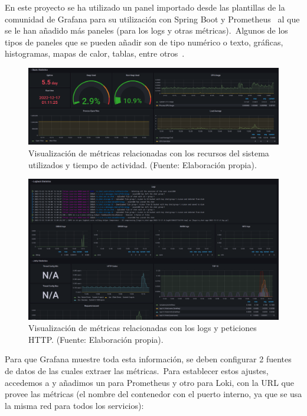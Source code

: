 En este proyecto se ha utilizado un panel importado desde las plantillas de la comunidad de Grafana para su utilización
con Spring Boot y Prometheus~\cite{spring-dashboard} al que se le han añadido más paneles (para los logs y otras
métricas).\ Algunos de los tipos de paneles que se pueden añadir son de tipo numérico o texto, gráficas, histogramas,
mapas de calor, tablas, entre otros~\cite{visualizaciones-grafana}.

\begin{figure}[H]
	\centering
	\includegraphics[width=\textwidth]{res/images/GrafanaDashboard_1}
	\caption{Visualización de métricas relacionadas con los recursos del sistema utilizados y tiempo de actividad.
		(Fuente: Elaboración propia).}
	\label{fig:grafana-dashboard_1}
\end{figure}

\begin{figure}[H]
	\centering
	\includegraphics[width=\textwidth]{res/images/GrafanaDashboard_2}
	\caption{Visualización de métricas relacionadas con los logs y peticiones HTTP. (Fuente: Elaboración propia).}
	\label{fig:grafana-dashboard_2}
\end{figure}

Para que Grafana muestre toda esta información, se deben configurar 2 fuentes de datos de las cuales extraer las
métricas.\ Para establecer estos ajustes, accedemos a  y añadimos un
 para Prometheus y otro para Loki, con la URL que provee las métricas (el nombre del contenedor con
el puerto interno, ya que se usa la misma red para todos los servicios):

